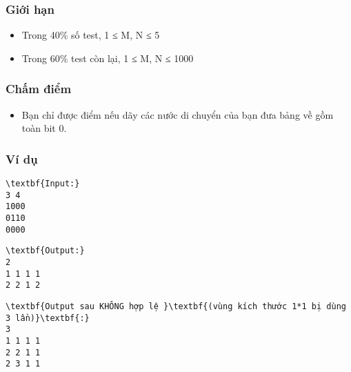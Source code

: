\subsubsection{   Giới hạn  }
\begin{itemize}
	\item     Trong 40\% số test, 1 ≤ M, N ≤ 5   
	\item     Trong 60\% test còn lại, 1 ≤ M, N ≤ 1000   
\end{itemize}

\subsubsection{   Chấm điểm  }
\begin{itemize}
	\item     Bạn chỉ được điểm nếu dãy các nước di chuyển của bạn đưa bảng về gồm toàn bit 0.   
\end{itemize}

\subsubsection{   Ví dụ  }
\begin{verbatim}
\textbf{Input:}
3 4
1000
0110
0000
\end{verbatim}
\begin{verbatim}
\textbf{Output:}
2
1 1 1 1
2 2 1 2
\end{verbatim}
\begin{verbatim}
\textbf{Output sau KHÔNG hợp lệ }\textbf{(vùng kích thước 1*1 bị dùng 3 lần)}\textbf{:}
3
1 1 1 1
2 2 1 1
2 3 1 1
\end{verbatim}